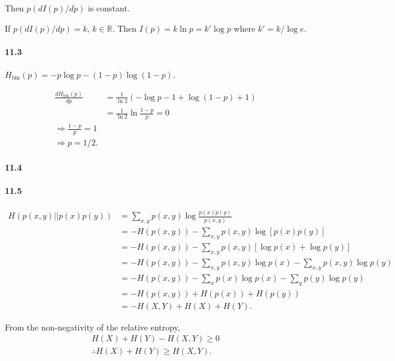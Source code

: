 Then $p (d I(p) / d p)$ is constant.

If $p (d I(p) / d p) = k$, $k \in \mathds{R}$.
Then $I(p) = k \ln p = k' \log p$ where $k' = k / \log e$.



\paragraph{11.3}
$H_{\text{bin}}(p) = - p\log p - (1-p) \log (1-p)$.

\begin{align}
    \frac{d H_{\text{bin}}(p)}{d p}
        &= \frac{1}{\ln 2} \left( - \log p - 1 + \log (1-p) + 1 \right)\\
        &= \frac{1}{\ln 2} \ln \frac{1-p}{p} = 0\\
    \Rightarrow \frac{1-p}{p} = 1\\
    \Rightarrow p = 1/2.
\end{align}


\paragraph{11.4}
\paragraph{11.5}

\begin{align}
    H\left( p(x,y) || p(x)p(y) \right)
        &= \sum_{x,y} p(x,y) \log \frac{p(x) p(y)}{p(x,y)}\\
        &= - H(p(x,y)) - \sum_{x,y} p(x,y) \log \left[ p(x)p(y) \right]\\
        &= - H(p(x,y)) - \sum_{x,y} p(x,y) \left[ \log p(x) + \log p(y) \right]\\
        &= - H(p(x,y)) - \sum_{x,y} p(x,y) \log p(x) - \sum_{x,y} p(x,y) \log p(y)\\
        &= - H(p(x,y)) - \sum_{x} p(x) \log p(x) - \sum_{y} p(y) \log p(y)\\
        &= - H(p(x,y)) + H(p(x)) + H(p(y))\\
        &= - H(X,Y) + H(X) + H(Y).
\end{align}

From the non-negativity of the relative entropy,
\begin{align}
    H(X) +  H(Y) - H(X,Y) \geq 0\\
    \therefore H(X) + H(Y) \geq H(X,Y).
\end{align}



